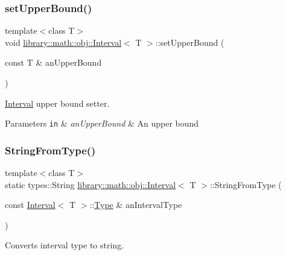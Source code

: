 \subsubsection{\texorpdfstring{set\+Upper\+Bound()}{setUpperBound()}}
{\footnotesize\ttfamily template$<$class T$>$ \\
void \hyperlink{classlibrary_1_1math_1_1obj_1_1_interval}{library\+::math\+::obj\+::\+Interval}$<$ T $>$\+::set\+Upper\+Bound (\begin{DoxyParamCaption}\item[{const T \&}]{an\+Upper\+Bound }\end{DoxyParamCaption})}



\hyperlink{classlibrary_1_1math_1_1obj_1_1_interval}{Interval} upper bound setter. 


\begin{DoxyParams}[1]{Parameters}
\mbox{\tt in}  & {\em an\+Upper\+Bound} & An upper bound \\
\hline
\end{DoxyParams}
\mbox{\label{classlibrary_1_1math_1_1obj_1_1_interval_a64a1850152db9b95c9824c71378d9f40}} 
\subsubsection{\texorpdfstring{String\+From\+Type()}{StringFromType()}}
{\footnotesize\ttfamily template$<$class T$>$ \\
static types\+::\+String \hyperlink{classlibrary_1_1math_1_1obj_1_1_interval}{library\+::math\+::obj\+::\+Interval}$<$ T $>$\+::String\+From\+Type (\begin{DoxyParamCaption}\item[{const \hyperlink{classlibrary_1_1math_1_1obj_1_1_interval}{Interval}$<$ T $>$\+::\hyperlink{classlibrary_1_1math_1_1obj_1_1_interval_abc7177f1c446d8273e70c989953667d1}{Type} \&}]{an\+Interval\+Type }\end{DoxyParamCaption})\hspace{0.3cm}{\ttfamily [static]}}



Converts interval type to string. 


